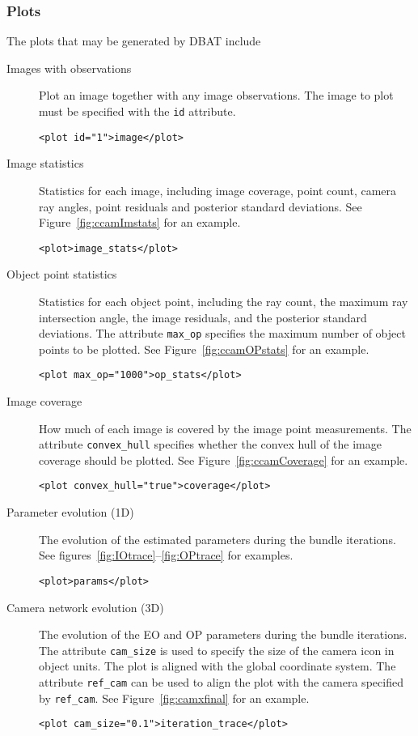 \documentclass{article}
\begin{document}
\subsubsection{Plots}
\label{sec:plots}
The plots that may be generated by DBAT include
\begin{description}
\item[{Images with observations}] Plot an image together with any image
observations. The image to plot must be specified with the \texttt{id} attribute.
\begin{verbatim}
<plot id="1">image</plot>
\end{verbatim}
\item[{Image statistics}] Statistics for each image, including image
coverage, point count, camera ray angles, point residuals and
posterior standard deviations. See Figure~\ref{fig:ccamImstats} for
an example.
\begin{verbatim}
<plot>image_stats</plot>
\end{verbatim}
\item[{Object point statistics}] Statistics for each object point,
including the ray count, the maximum ray intersection angle, the
image residuals, and the posterior standard deviations. The
attribute \texttt{max\_op} specifies the maximum number of object points
to be plotted. See Figure~\ref{fig:ccamOPstats} for an example.
\begin{verbatim}
<plot max_op="1000">op_stats</plot>
\end{verbatim}
\item[{Image coverage}] How much of each image is covered by the image
point measurements. The attribute \texttt{convex\_hull}
specifies whether the convex hull of the image
coverage should be plotted. See
Figure~\ref{fig:ccamCoverage} for an example.
\begin{verbatim}
<plot convex_hull="true">coverage</plot>
\end{verbatim}
\item[{Parameter evolution (1D)}] The evolution of the estimated
parameters during the bundle iterations. See
figures~\ref{fig:IOtrace}--\ref{fig:OPtrace} for examples.
\begin{verbatim}
<plot>params</plot>
\end{verbatim}
\item[{Camera network evolution (3D)}] The evolution of the EO and OP
parameters during the bundle iterations. The attribute \texttt{cam\_size}
is used to specify the size of the camera icon in object units.
The plot is aligned with the global coordinate system. The
attribute \texttt{ref\_cam} can be used to align the plot with the camera
specified by \texttt{ref\_cam}. See Figure~\ref{fig:camxfinal} for an
example.
\begin{verbatim}
<plot cam_size="0.1">iteration_trace</plot>
\end{verbatim}
\end{description}
\end{document}
